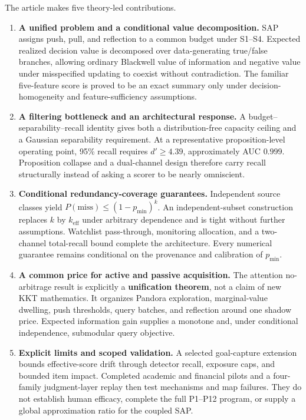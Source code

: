 \documentclass[
  11pt]{article}
\providecommand{\tightlist}{%
  \setlength{\itemsep}{0pt}\setlength{\parskip}{0pt}}
\begin{document}
The article makes five theory-led contributions.

\begin{enumerate}
\def\labelenumi{\arabic{enumi}.}
\tightlist
\item
  \textbf{A unified problem and a conditional value decomposition.} SAP assigns push, pull, and reflection to a common budget under S1--S4. Expected realized decision value is decomposed over data-generating true/false branches, allowing ordinary Blackwell value of information and negative value under misspecified updating to coexist without contradiction. The familiar five-feature score is proved to be an exact summary only under decision-homogeneity and feature-sufficiency assumptions.
\item
  \textbf{A filtering bottleneck and an architectural response.} A budget--separability--recall identity gives both a distribution-free capacity ceiling and a Gaussian separability requirement. At a representative proposition-level operating point, 95\% recall requires \(d'\geq4.39\), approximately AUC \(0.999\). Proposition collapse and a dual-channel design therefore carry recall structurally instead of asking a scorer to be nearly omniscient.
\item
  \textbf{Conditional redundancy-coverage guarantees.} Independent source classes yield \(P(\mathrm{miss})\leq(1-p_{\min})^k\). An independent-subset construction replaces \(k\) by \(k_{\mathrm{eff}}\) under arbitrary dependence and is tight without further assumptions. Watchlist pass-through, monitoring allocation, and a two-channel total-recall bound complete the architecture. Every numerical guarantee remains conditional on the provenance and calibration of \(p_{\min}\).
\item
  \textbf{A common price for active and passive acquisition.} The attention no-arbitrage result is explicitly a \textbf{unification theorem}, not a claim of new KKT mathematics. It organizes Pandora exploration, marginal-value dwelling, push thresholds, query batches, and reflection around one shadow price. Expected information gain supplies a monotone and, under conditional independence, submodular query objective.
\item
  \textbf{Explicit limits and scoped validation.} A selected goal-capture extension bounds effective-score drift through detector recall, exposure caps, and bounded item impact. Completed academic and financial pilots and a four-family judgment-layer replay then test mechanisms and map failures. They do not establish human efficacy, complete the full P1--P12 program, or supply a global approximation ratio for the coupled SAP.
\end{enumerate}
\end{document}
